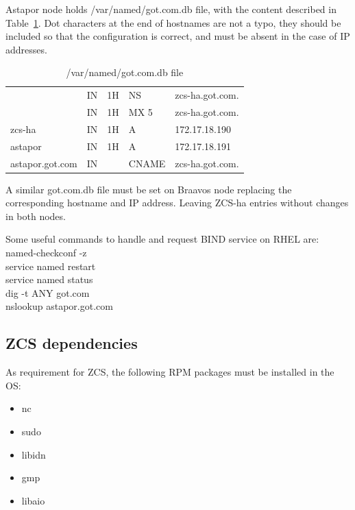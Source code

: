 \documentclass[a4paper, 12pt]{book}
\begin{document}
\noindent Astapor node holds /var/named/got.com.db file, with the content described in Table~\ref{table:bindastapor}. Dot characters at the end of hostnames are not a typo, they should be included so that the configuration is correct, and must be absent in the case of IP addresses.

\FloatBarrier
\begin{table}[H]
  \centering
  \begin{tabular}{ | l l l l l | }
    \hline
	                  & IN & 1H & NS    & zcs-ha.got.com.\\
                      & IN & 1H & MX 5  & zcs-ha.got.com.\\
      zcs-ha          & IN & 1H & A     & 172.17.18.190\\
      astapor         & IN & 1H & A     & 172.17.18.191\\
      astapor.got.com & IN &    & CNAME & zcs-ha.got.com.\\
    \hline
  \end{tabular}
\caption{/var/named/got.com.db file}
\label{table:bindastapor}
\end{table}

\noindent A similar got.com.db file must be set on Braavos node replacing the corresponding hostname and IP address. Leaving ZCS-ha entries without changes in both nodes.\bigskip

\noindent Some useful commands to handle and request BIND service on RHEL are:\\
\indent named-checkconf -z \\
\indent service named restart \\
\indent service named status \\
\indent dig -t ANY got.com \\
\indent nslookup astapor.got.com

\subsection{ZCS dependencies}
\label{sec:zcsdeps}

As requirement for ZCS, the following RPM packages must be installed in the OS:

\begin{itemize}
	\item nc
	\item sudo
	\item libidn 
	\item gmp 
	\item libaio 
\end{itemize}
\end{document}
